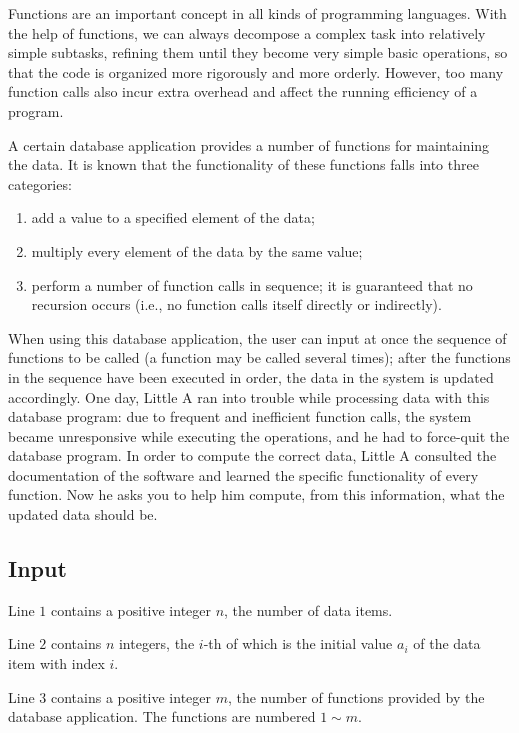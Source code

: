 \documentclass[11pt]{article}
\begin{document}
Functions are an important concept in all kinds of programming languages.
With the help of functions, we can always decompose a complex task into
relatively simple subtasks, refining them until they become very simple basic
operations, so that the code is organized more rigorously and more orderly.
However, too many function calls also incur extra overhead and affect the
running efficiency of a program.

A certain database application provides a number of functions for maintaining
the data.
It is known that the functionality of these functions falls into three
categories:
\begin{enumerate}
\item add a value to a specified element of the data;
\item multiply every element of the data by the same value;
\item perform a number of function calls in sequence; it is guaranteed that
  no recursion occurs (i.e., no function calls itself directly or
  indirectly).
\end{enumerate}

When using this database application, the user can input at once the sequence
of functions to be called (a function may be called several times);
after the functions in the sequence have been executed in order, the data in
the system is updated accordingly.
One day, Little A ran into trouble while processing data with this database
program: due to frequent and inefficient function calls, the system became
unresponsive while executing the operations, and he had to force-quit the
database program.
In order to compute the correct data, Little A consulted the documentation of
the software and learned the specific functionality of every function.
Now he asks you to help him compute, from this information, what the updated
data should be.

\subsection*{Input}

Line $1$ contains a positive integer $n$, the number of data items.

Line $2$ contains $n$ integers, the $i$-th of which is the initial value $a_i$
of the data item with index $i$.

Line $3$ contains a positive integer $m$, the number of functions provided by
the database application.
The functions are numbered $1 \sim m$.
\end{document}
